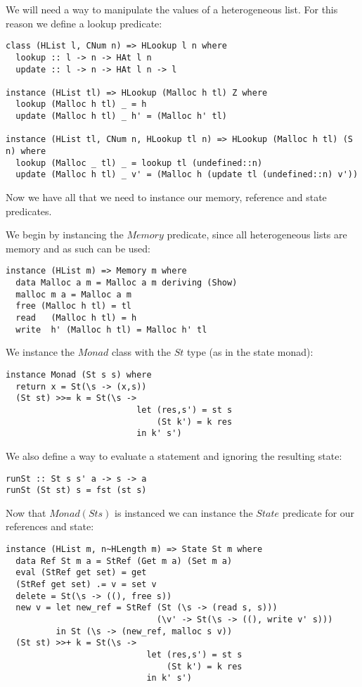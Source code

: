 We will need a way to manipulate the values of a heterogeneous list. For this reason we define a lookup predicate:
\begin{lstlisting}
class (HList l, CNum n) => HLookup l n where
  lookup :: l -> n -> HAt l n
  update :: l -> n -> HAt l n -> l

instance (HList tl) => HLookup (Malloc h tl) Z where
  lookup (Malloc h tl) _ = h
  update (Malloc h tl) _ h' = (Malloc h' tl)

instance (HList tl, CNum n, HLookup tl n) => HLookup (Malloc h tl) (S n) where
  lookup (Malloc _ tl) _ = lookup tl (undefined::n)
  update (Malloc h tl) _ v' = (Malloc h (update tl (undefined::n) v'))
\end{lstlisting}

Now we have all that we need to instance our memory, reference and state predicates.

We begin by instancing the $Memory$ predicate, since all heterogeneous lists are memory and as such can be used:
\begin{lstlisting}
instance (HList m) => Memory m where
  data Malloc a m = Malloc a m deriving (Show)
  malloc m a = Malloc a m
  free (Malloc h tl) = tl
  read   (Malloc h tl) = h
  write  h' (Malloc h tl) = Malloc h' tl
\end{lstlisting}

We instance the $Monad$ class with the $St$ type (as in the state monad):
\begin{lstlisting}
instance Monad (St s s) where
  return x = St(\s -> (x,s))
  (St st) >>= k = St(\s -> 
                          let (res,s') = st s 
                              (St k') = k res
                          in k' s')
\end{lstlisting}

We also define a way to evaluate a statement and ignoring the resulting state:
\begin{lstlisting}
runSt :: St s s' a -> s -> a
runSt (St st) s = fst (st s)
\end{lstlisting}

Now that $Monad (St s)$ is instanced we can instance the $State$ predicate for our references and state:
\begin{lstlisting}
instance (HList m, n~HLength m) => State St m where
  data Ref St m a = StRef (Get m a) (Set m a)
  eval (StRef get set) = get
  (StRef get set) .= v = set v
  delete = St(\s -> ((), free s))
  new v = let new_ref = StRef (St (\s -> (read s, s)))
                              (\v' -> St(\s -> ((), write v' s)))
          in St (\s -> (new_ref, malloc s v))
  (St st) >>+ k = St(\s -> 
                            let (res,s') = st s 
                                (St k') = k res
                            in k' s')
\end{lstlisting}

